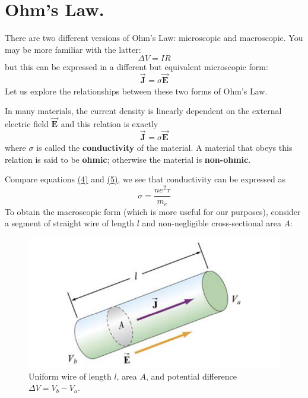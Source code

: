 \documentclass[11pt, letterpaper]{article}
\newcommand{\bv}[2][]{\bm{\vec{#2}_{#1}}}
\begin{document}
\section{Ohm's Law.}
	There are two different versions of Ohm's Law: microscopic and macroscopic. You may be more familiar with the latter: \[\Delta V = IR\] but this can be expressed in a different but equivalent microscopic form: \[\bv{J} = \sigma\bv{E}\] Let us explore the relationships between these two forms of Ohm's Law.
	
	In many materials, the current density is linearly dependent on the external electric field $\bv{E}$ and this relation is exactly 
	\begin{equation}\label{eqn:micro-ohm}
		\boxed{\bv{J} = \sigma\bv{E}}
	\end{equation} where $\sigma$ is called the \textbf{conductivity} of the material. A material that obeys this relation is said to be  \textbf{ohmic}; otherwise the material is \textbf{non-ohmic}.
	
	Compare equations \hyperref[eqn:curr-density]{(4)} and \hyperref[eqn:micro-ohm]{(5)}, we see that conductivity can be expressed as 
	\begin{equation}\label{eqn:conductivity}
		\boxed{\sigma = \frac{ne^2\tau}{m_e}}
	\end{equation}
To obtain the macroscopic form (which is more useful for our purposes), consider a segment of straight wire of length $l$ and non-negligible cross-sectional area $A$:
\begin{figure}[h!]
	\centering
	\includegraphics[scale=0.6]{wire.png}
	\caption{Uniform wire of length $l$, area $A$, and potential difference $\Delta V = V_b - V_a$.}
	\label{fig:wire}
\end{figure}
\end{document}
